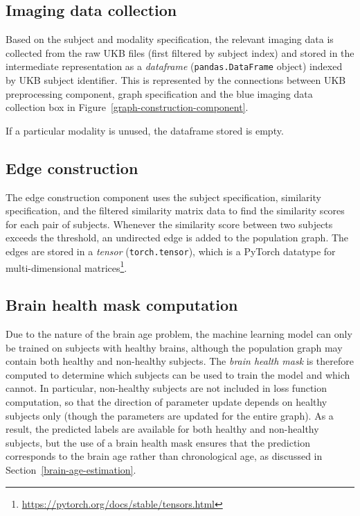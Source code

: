 \subsection{Imaging data collection}

Based on the subject and modality specification, the relevant imaging data is collected from the raw UKB files (first filtered by subject index) and stored in the intermediate representation as a \textit{dataframe} (\texttt{pandas.DataFrame} object) indexed by UKB subject identifier. This is represented by the connections between UKB preprocessing component, graph specification and the blue imaging data collection box in Figure~\ref{graph-construction-component}. 

If a particular modality is unused, the dataframe stored is empty.

\subsection{Edge construction}

The edge construction component uses the subject specification, similarity specification, and the filtered similarity matrix data to find the similarity scores for each pair of subjects. Whenever the similarity score between two subjects exceeds the threshold, an undirected edge is added to the population graph. The edges are stored in a \textit{tensor} (\texttt{torch.tensor}), which is a PyTorch datatype for multi-dimensional matrices\footnote{\url{https://pytorch.org/docs/stable/tensors.html}}.

\subsection{Brain health mask computation}

Due to the nature of the brain age problem, the machine learning model can only be trained on subjects with healthy brains, although the population graph may contain both healthy and non-healthy subjects. The \textit{brain health mask} is therefore computed to determine which subjects can be used to train the model and which cannot. In particular, non-healthy subjects are not included in loss function computation, so that the direction of parameter update depends on healthy subjects only (though the parameters are updated for the entire graph). As a result, the predicted labels are available for both healthy and non-healthy subjects, but the use of a brain health mask ensures that the prediction corresponds to the brain age rather than chronological age, as discussed in Section~\ref{brain-age-estimation}.

